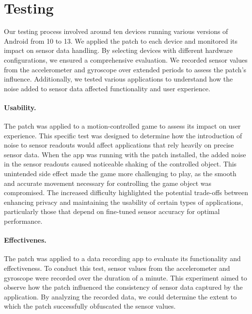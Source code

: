 \documentclass[11pt,
  oneside,openany,    %
]{scrreprt}
\begin{document}
\section{Testing}
\label{sec:testing}
Our testing process involved around ten devices running various versions of Android from 10 to 13.
We applied the patch to each device and monitored its impact on sensor data handling.
By selecting devices with different hardware configurations, we ensured a comprehensive evaluation.
We recorded sensor values from the accelerometer and gyroscope over extended periods to assess the patch's influence.
Additionally, we tested various applications to understand how the noise added to sensor data affected functionality and user experience.

\paragraph{Usability.}
\label{par:usability}
The patch was applied to a motion-controlled game \cite{krassesSpiel} to assess its impact on user experience.
This specific test was designed to determine how the introduction of noise to sensor readouts would affect applications that rely heavily on precise sensor data.
When the app was running with the patch installed, the added noise in the sensor readouts caused noticeable shaking of the controlled object.
This unintended side effect made the game more challenging to play, as the smooth and accurate movement necessary for controlling the game object was compromised.
The increased difficulty highlighted the potential trade-offs between enhancing privacy and maintaining the usability of certain types of applications, particularly those that depend on fine-tuned sensor accuracy for optimal performance.

\paragraph{Effectivenes.}
\label{par:effectiveness}
The patch was applied to a data recording app \cite{SensorBox} to evaluate its functionality and effectiveness.
To conduct this test, sensor values from the accelerometer and gyroscope were recorded over the duration of a minute.
This experiment aimed to observe how the patch influenced the consistency of sensor data captured by the application.
By analyzing the recorded data, we could determine the extent to which the patch successfully obfuscated the sensor values.
\end{document}
